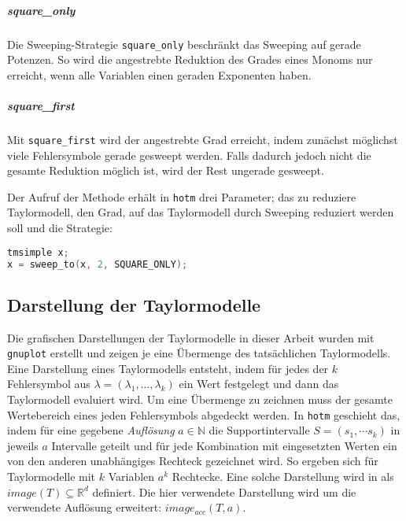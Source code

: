 \subparagraph{square\_only}
Die Sweeping-Strategie \verb+square_only+ beschränkt das Sweeping auf gerade Potenzen. So wird die angestrebte Reduktion des Grades eines Monoms nur erreicht, wenn alle Variablen einen geraden Exponenten haben.


\subparagraph{square\_first}
Mit \verb+square_first+ wird der angestrebte Grad erreicht, indem zunächst möglichst viele Fehlersymbole gerade gesweept werden. Falls dadurch jedoch nicht die gesamte Reduktion möglich ist, wird der Rest ungerade gesweept.

Der Aufruf der Methode erhält in \verb+hotm+ drei Parameter; das zu reduziere Taylormodell, den Grad, auf das Taylormodell durch Sweeping reduziert werden soll und die Strategie:

 \begin{lstlisting}[language=C++, caption=Beispielaufruf der Sweeping-Routine,captionpos=b,xleftmargin=15pt]
tmsimple x;
x = sweep_to(x, 2, SQUARE_ONLY);
\end{lstlisting}



\subsection{Darstellung der Taylormodelle}
Die grafischen Darstellungen der Taylormodelle in dieser Arbeit wurden mit \verb+gnuplot+ \cite{gnuplot} erstellt und zeigen je eine Übermenge des tatsächlichen Taylormodells. Eine Darstellung eines Taylormodells entsteht, indem für jedes der $k$ Fehlersymbol aus $\lambda=(\lambda_1, \dots, \lambda_k)$ ein Wert festgelegt und dann das Taylormodell evaluiert wird. Um eine Übermenge zu zeichnen muss der gesamte Wertebereich eines jeden Fehlersymbols abgedeckt werden. In \verb+hotm+ geschieht das, indem für eine gegebene \textit{Auflösung} $a \in \mathbb{N}$ die Supportintervalle $S=(s_1, \cdots s_k)$ in jeweils $a$ Intervalle geteilt und für jede Kombination mit eingesetzten Werten ein von den anderen unabhängiges Rechteck gezeichnet wird. So ergeben sich für Taylormodelle mit $k$ Variablen $a^k$ Rechtecke. Eine solche Darstellung wird in \cite{DBLP:conf/macis/BrausseKM15} als $image(T) \subseteq \mathbb{R}^d$ definiert. Die hier verwendete Darstellung wird um die verwendete Auflösung erweitert: $image_{acc}(T,a)$.


